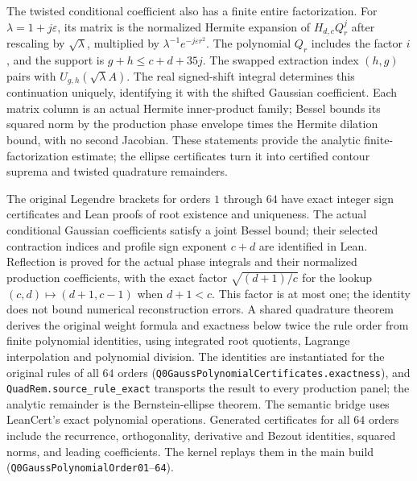 \documentclass[11pt,a4paper]{article}
\newcommand{\lean}[1]{\texttt{\small #1}}
\begin{document}
The twisted conditional coefficient also has a finite entire factorization.
For $\lambda=1+j\varepsilon$, its matrix is the normalized Hermite expansion of
$H_{d,c}Q_r^j$ after rescaling by $\sqrt\lambda$, multiplied by
$\lambda^{-1}e^{-j\varepsilon r^2}$. The polynomial $Q_r$ includes the factor $i$,
and the support is $g+h\le c+d+35j$. The swapped extraction index $(h,g)$
pairs with $U_{g,h}(\sqrt\lambda A)$. The real signed-shift integral determines
this continuation uniquely, identifying it with the shifted Gaussian
coefficient. Each matrix column is an actual Hermite inner-product family;
Bessel bounds its squared norm by the production phase envelope times the
Hermite dilation bound, with no second Jacobian. These statements provide
the analytic finite-factorization estimate; the ellipse certificates turn it
into certified contour suprema and twisted quadrature remainders.

The original Legendre brackets for orders $1$ through $64$ have exact
integer sign certificates and Lean proofs of root existence and uniqueness.
The actual conditional Gaussian coefficients satisfy a joint Bessel bound;
their selected contraction indices and profile sign exponent $c+d$ are
identified in Lean. Reflection is proved for the actual phase integrals and
their normalized production coefficients, with the exact factor
$\sqrt{(d+1)/c}$ for the lookup $(c,d)\mapsto(d+1,c-1)$ when $d+1<c$.
This factor is at most one; the identity does not bound numerical
reconstruction errors.
A shared quadrature theorem derives the original weight
formula and exactness below twice the rule order from finite polynomial
identities, using integrated root quotients, Lagrange interpolation and
polynomial division. The identities are instantiated for the original rules
of all $64$ orders (\lean{Q0GaussPolynomialCertificates.exactness}), and
\lean{QuadRem.source\_rule\_exact} transports the result to every production
panel; the analytic remainder is the Bernstein-ellipse theorem.
The semantic bridge uses LeanCert's exact polynomial operations.
Generated certificates for all $64$ orders include the recurrence,
orthogonality, derivative and Bezout identities, squared norms, and leading
coefficients. The kernel replays them in the main build
(\lean{Q0GaussPolynomialOrder01}--\lean{64}).
\end{document}

